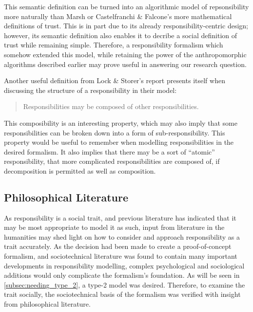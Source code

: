 This semantic definition can be turned into an algorithmic model of repsonsibility more naturally than Marsh or Castelfranchi \& Falcone's more mathematical definitions of trust. This is in part due to its already responsibility-centric design; however, its semantic definition also enables it to decribe a social definition of trust while remaining simple. Therefore, a responsibility formalism which somehow extended this model, while retaining the power of the anthropomorphic algorithms described earlier may prove useful in answering our research question.\par

Another useful definition from Lock \& Storer's report presents itself when discussing the structure of a responsibility in their model:

\begin{quotation}
    Responsibilities may be composed of other responsibilities.
\end{quotation}

This composibility is an interesting property, which may also imply that some responsibilities can be broken down into a form of sub-responsibility. This property would be useful to remember when modelling responsibilities in the desired formalism. It also implies that there may be a sort of ``atomic'' responsibility, that more complicated responsibilities are composed of, if decomposition is permitted as well as composition.\par

\subsection{Philosophical Literature}  %
As responsibility is a social trait, and previous literature has indicated that it may be most appropriate to model it as such, input from literature in the humanities may shed light on how to consider and approach responsibility as a trait accurately. As the decision had been made to create a proof-of-concept formalism, and sociotechnical literature was found to contain many important developments in responsibility modelling, complex psychological and sociological additions would only complicate the formalism's foundation. As will be seen in \cref{subsec:needing_type_2}, a type-2 model was desired. Therefore, to examine the trait socially, the sociotechnical basis of the formalism was verified with insight from philosophical literature.\par

